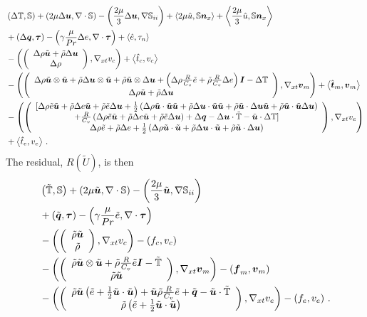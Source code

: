\documentclass[Proposal.tex]{subfiles}
\begin{document}
\begin{equation}
\label{eq:compressibleJacobian}
\begin{aligned}
	&\LRp{\Delta\mathbb{T},\mathbb{S}}+\LRp{2\mu\Delta\bfu,\Div\mathbb{S}}-\LRp{\frac{2\mu}{3}\Delta\bfu,\Grad\mathbb{S}_{ii}}
	+\LRa{2\mu\hat u,\mathbb{S}\bfn_x}+\LRa{\frac{2\mu}{3}\hat u,\mathbb{S}\bfn_x}\\
	&+\LRp{\Delta\bfq,\bftau}-\LRp{\gamma\frac{\mu}{Pr}\Delta e,\Div\bftau}+\LRa{\hat e,\tau_n}\\
	&-\LRp{\vecttwo{\Delta\rho\tilde\bfu+\tilde\rho\Delta\bfu}
	{\Delta\rho},\Gradxt v_c}
	+\LRa{\hat t_c,v_c}\\
	&-\LRp{\vecttwo{\Delta\rho\tilde\bfu\otimes\tilde\bfu+\tilde\rho\Delta\bfu\otimes\tilde\bfu+\tilde\rho\tilde\bfu\otimes\Delta\bfu
	+\LRp{\Delta\rho\frac{R}{C_v}\tilde e+\tilde\rho\frac{R}{C_v}\Delta e}\bfI-\Delta\mathbb{T}}
	{\Delta\rho\tilde\bfu+\tilde\rho\Delta\bfu},\Gradxt\bfv_m}
	+\LRa{\hat\bft_m,\bfv_m}\\
	&-\LRp{\vectthree{[\Delta\rho\tilde e\tilde\bfu+\tilde\rho\Delta e\tilde\bfu+\tilde\rho\tilde e\Delta\bfu
	+\frac{1}{2}\LRp{\Delta\rho\tilde\bfu\cdot\tilde\bfu\tilde\bfu+\tilde\rho\Delta\bfu\cdot\tilde\bfu\tilde\bfu
	+\tilde\rho\tilde\bfu\cdot\Delta\bfu\tilde\bfu+\tilde\rho\tilde\bfu\cdot\tilde\bfu\Delta\bfu}}
	{+\frac{R}{C_v}\LRp{\Delta\rho\tilde e\tilde\bfu+\tilde\rho\Delta e\tilde\bfu+\tilde\rho\tilde e\Delta\bfu}
	+\Delta\bfq-\Delta\bfu\cdot\tilde{\mathbb{T}}-\tilde\bfu\cdot\Delta\mathbb{T}]}
	{\Delta\rho\tilde e+\tilde\rho\Delta e
	+\frac{1}{2}\LRp{\Delta\rho\tilde\bfu\cdot\tilde\bfu+\tilde\rho\Delta\bfu\cdot\tilde\bfu+\tilde\rho\tilde\bfu\cdot\Delta\bfu}},\Gradxt v_e}\\
	&+\LRa{\hat t_e,v_e}\,.
\end{aligned}
\end{equation}
The residual, $R(\tilde U)$, is then
\begin{equation}
\begin{aligned}
	&\left( \tilde{\mathbb{T}},\mathbb{S} \right)+\left( 2\mu\tilde{\boldsymbol u},\nabla\cdot\mathbb{S} \right)-\left( \frac{2\mu}{3}\tilde{\boldsymbol u},\nabla\mathbb{S}_{ii} \right)\\
	&+\left( \tilde{\boldsymbol q},\boldsymbol\tau \right)-\left( \gamma\frac{\mu}{Pr}\tilde e,\nabla\cdot\boldsymbol\tau \right)\\
	&-\left( \left( \begin{array}{c} \tilde\rho\tilde{\boldsymbol u}\\ \tilde\rho\\ \end{array} \right),\nabla_{xt} v_c \right)-\left( f_c,v_c \right)\\
	&-\left( \left( \begin{array}{c} \tilde\rho\tilde{\boldsymbol u}\otimes\tilde{\boldsymbol u}+\tilde\rho\frac{R}{C_v}\tilde e\boldsymbol I-\tilde{\mathbb{T}}\\ \tilde\rho\tilde{\boldsymbol u}\\ \end{array} \right),
	\nabla_{xt}\boldsymbol v_m \right)-\left( \boldsymbol f_m,\boldsymbol v_m \right)\\
	&-\left( \left( \begin{array}{c} \tilde\rho\tilde{\boldsymbol u}\left( \tilde e+\frac{1}{2}\tilde{\boldsymbol u}\cdot\tilde{\boldsymbol u} \right)+\tilde{\boldsymbol u}\tilde\rho\frac{R}{C_v}\tilde e+\tilde{\boldsymbol q}-\tilde{\boldsymbol u}\cdot\tilde{\mathbb{T}}\\ \tilde\rho\left( \tilde e+\frac{1}{2}\tilde{\boldsymbol u}\cdot\tilde{\boldsymbol u} \right)\\ \end{array} \right),
	\nabla_{xt} v_e \right)-\left( f_e,v_e \right)\,.
\end{aligned}
\end{equation}
\end{document}
